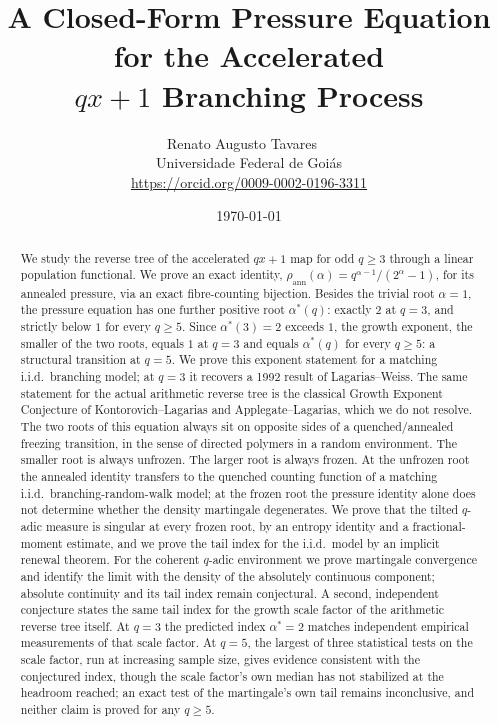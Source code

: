 \documentclass[11pt]{article}
\title{A Closed-Form Pressure Equation for the Accelerated\\
$qx+1$ Branching Process}
\author{Renato Augusto Tavares~{\small\href{mailto:dr.renatotavares@gmail.com}{\textcolor{black}{\faEnvelope}}}~\orcidlink{0009-0002-0196-3311}\\
\normalsize Universidade Federal de Goiás\\
\small \href{https://orcid.org/0009-0002-0196-3311}{https://orcid.org/0009-0002-0196-3311}}
\date{\today}
\theoremstyle{remark}
\begin{document}
\maketitle

\begin{abstract}
We study the reverse tree of the accelerated $qx+1$ map for odd
$q\ge3$ through a linear population functional. We prove an exact
identity, $\rho_{\mathrm{ann}}(\alpha)=q^{\alpha-1}/(2^\alpha-1)$, for
its annealed pressure, via an exact fibre-counting bijection. Besides the trivial root $\alpha=1$, the pressure equation has one
further positive root $\alpha^\ast(q)$: exactly $2$ at $q=3$, and
strictly below $1$ for every $q\ge5$. Since $\alpha^\ast(3)=2$ exceeds
$1$, the growth exponent, the smaller of the two roots, equals $1$ at
$q=3$ and equals $\alpha^\ast(q)$ for every $q\ge5$: a structural
transition at $q=5$. We prove this exponent statement for a matching
i.i.d.\ branching model; at $q=3$ it recovers a 1992 result of
Lagarias--Weiss. The same statement for the actual arithmetic reverse
tree is the classical Growth Exponent Conjecture of
Kontorovich--Lagarias and Applegate--Lagarias, which we do not
resolve. The two roots of this equation always sit on opposite sides of a
quenched/annealed freezing transition, in the sense of directed
polymers in a random environment. The smaller root is always unfrozen.
The larger root is always frozen. At the unfrozen root the
annealed identity transfers to the quenched counting function of a
matching i.i.d.\ branching-random-walk model; at the frozen root the
pressure identity alone does not determine whether the density
martingale degenerates. We prove that the tilted $q$-adic measure is
singular at every frozen root, by an entropy identity and a
fractional-moment estimate, and we prove the tail index for the i.i.d.\
model by an implicit renewal theorem. For the coherent $q$-adic
environment we prove martingale convergence and identify the limit
with the density of the absolutely continuous component; absolute
continuity and its tail index remain conjectural. A second, independent
conjecture states the same tail index for the growth scale factor of
the arithmetic reverse tree itself. At $q=3$ the predicted index
$\alpha^\ast=2$ matches independent empirical measurements of that
scale factor. At $q=5$, the largest of three statistical tests on the
scale factor, run at increasing sample size, gives evidence consistent
with the conjectured index, though the scale factor's own median has
not stabilized at the headroom reached; an exact test of the
martingale's own tail remains inconclusive, and neither claim is
proved for any $q\ge5$.
\end{abstract}
\end{document}
